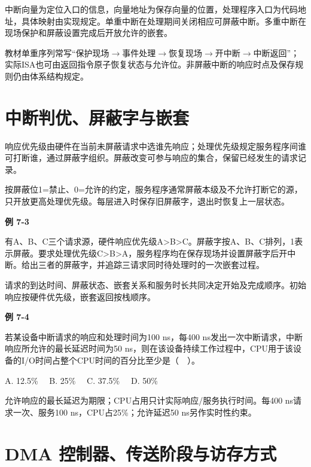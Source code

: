 中断向量为定位入口的信息，向量地址为保存向量的位置，处理程序入口为代码地址，具体映射由实现规定。单重中断在处理期间关闭相应可屏蔽中断。多重中断在现场保护和屏蔽设置完成后开放允许的嵌套。

教材单重序列常写“保护现场\ensuremath{\to}事件处理\ensuremath{\to}恢复现场\ensuremath{\to}开中断\ensuremath{\to}中断返回”；实际ISA也可由返回指令原子恢复状态与允许位。非屏蔽中断的响应时点及保存规则仍由体系结构规定。

\section{中断判优、屏蔽字与嵌套}\label{CO07-priority}

响应优先级由硬件在当前未屏蔽请求中选谁先响应；处理优先级规定服务程序间谁可打断谁，通过屏蔽字组织。屏蔽改变可参与响应的集合，保留已经发生的请求记录。

按屏蔽位1=禁止、0=允许的约定，服务程序通常屏蔽本级及不允许打断它的源，只开放更高处理优先级。每层进入时保存旧屏蔽字，退出时恢复上一层状态。

\par\medskip{}\noindent\hypertarget{CO07-E03}{}\label{CO07-E03}\textbf{例 7-3}\par\nobreak\smallskip

有A、B、C三个请求源，硬件响应优先级A\textgreater B\textgreater C。屏蔽字按A、B、C排列，1表示屏蔽。要求处理优先级C\textgreater B\textgreater A，服务程序均在保存现场并设置屏蔽字后开中断。给出三者的屏蔽字，并追踪三请求同时待处理时的一次嵌套过程。

请求的到达时间、屏蔽状态、嵌套关系和服务时长共同决定开始及完成顺序。初始响应按硬件优先级，嵌套返回按栈顺序。

\par\medskip{}\noindent\hypertarget{CO07-E04}{}\label{CO07-E04}\textbf{例 7-4}\par\nobreak\smallskip

若某设备中断请求的响应和处理时间为100 ns，每400 ns发出一次中断请求，中断响应所允许的最长延迟时间为50 ns，则在该设备持续工作过程中，CPU用于该设备的I/O时间占整个CPU时间的百分比至少是（　）。

A. 12.5\%　 B. 25\%　 C. 37.5\%　 D. 50\%

允许响应的最长延迟为期限；CPU占用只计实际响应/服务执行时间。每400 ns请求一次、服务100 ns，CPU占25\%；允许延迟50 ns另作实时性约束。

\section{DMA 控制器、传送阶段与访存方式}\label{CO07-direct}

